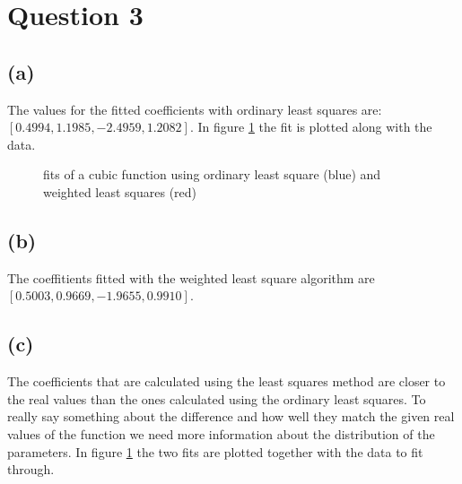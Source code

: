 \documentclass[a4paper]{article}
\begin{document}
\newpage
\section*{Question 3}

\subsection*{(a)}
\noindent {}

The values for the fitted coefficients with ordinary least squares are: $[0.4994, 1.1985, -2.4959, 1.2082]$. In figure \ref{fig:fit-3} the fit is plotted along with the data. 
\begin{figure}
	\centering
	
	\caption{fits of a cubic function using ordinary least square (blue) and weighted least squares (red)}
	\label{fig:fit-3}
\end{figure}

\subsection*{(b)}
\noindent {}

The coeffitients fitted with the weighted least square algorithm are $[0.5003, 0.9669, -1.9655, 0.9910]$.

\subsection*{(c)}
\noindent {}

The coefficients that are calculated using the least squares method are closer to the real values than the ones calculated using the ordinary least squares. To really say something about the difference and how well they match the given real values of the function we need more information about the distribution of the parameters.
In figure \ref{fig:fit-3} the two fits are plotted together with the data to fit through.
\end{document}
